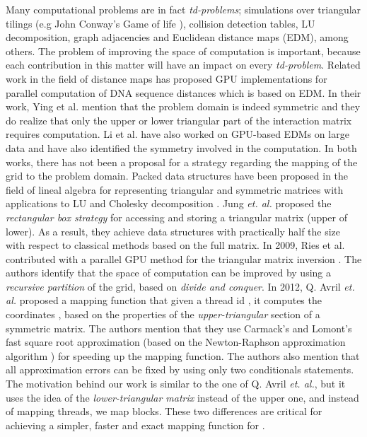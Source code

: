 \documentclass[conference]{IEEEtran}
\begin{document}
Many computational problems are in fact \textit{td-problems}; 
simulations over triangular tilings (e.g John Conway's Game of life \cite{ConwaysLife}), collision detection tables, LU decomposition, 
graph adjacencies and Euclidean distance maps (EDM), among others. The problem of improving the space of computation is important, 
because each contribution in this matter will have an impact on every \textit{td-problem}.
Related work in the field of distance maps has proposed GPU implementations for parallel computation of DNA sequence distances \cite{Ying:2011:GDD:2065356.2065583} which 
is based on EDM. In their work, Ying et al. mention that the problem domain is indeed symmetric and they do realize that only 
the upper or lower triangular part of the interaction matrix requires computation. Li et al. \cite{Li:2010:CME:1955604.1956601}
have also worked on GPU-based EDMs on large data and have also identified the symmetry involved in the computation. 
In both works, there has not been a proposal for a strategy regarding the mapping of the grid to the problem domain. 
Packed data structures have been proposed in the field of lineal algebra for representing triangular and symmetric matrices 
with applications to LU and Cholesky decomposition \cite{springerlink_gustavson}. Jung \textit{et. al.} \cite{Jung2008} proposed the \textit{rectangular box strategy} 
for accessing and storing a triangular matrix (upper of lower). 
As a result, they achieve data structures with practically half the size with respect to classical methods based on the full matrix. 
In 2009, Ries et al. contributed with a parallel GPU method for the triangular matrix inversion \cite{Ries:2009:TMI:1654059.1654069}. 
The authors identify that the space of computation can be improved by using a \textit{recursive partition} of the grid, based on \textit{divide and conquer}. 
In 2012, Q. Avril \textit{et. al.} \cite{AvrilGA12} proposed 
a mapping function that given a thread id , it computes the coordinates , based on the properties of 
the \textit{upper-triangular} section of a symmetric matrix. The authors mention that they use Carmack's and Lomont's 
fast square root approximation (based on the Newton-Raphson approximation algorithm \cite{Peelle:1974:TNS:585882.585889}) for speeding up the mapping function. The authors 
also mention that all approximation errors can be fixed by using only two conditionals statements. 
The motivation behind our work is similar to the one of Q. Avril \textit{et. al.}, but it uses the idea of the \textit{lower-triangular matrix} instead of the upper one, 
and instead of mapping threads, we map blocks. These two differences are critical for achieving a simpler, 
faster and exact mapping function for . 
\end{document}
